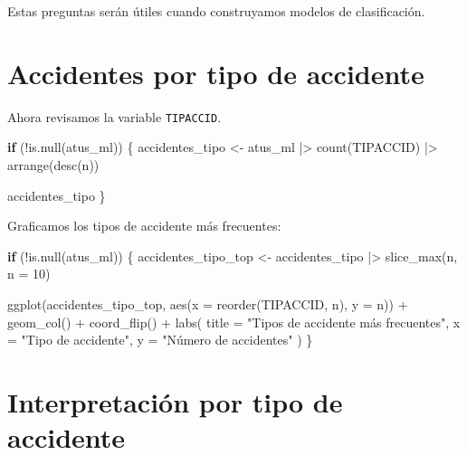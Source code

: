 \documentclass[
  11pt,
  letterpaper,
]{book}
\newenvironment{Shaded}{\begin{snugshade}}{\end{snugshade}}
\newcommand{\AttributeTok}[1]{\textcolor[rgb]{0.40,0.45,0.13}{#1}}
\newcommand{\ControlFlowTok}[1]{\textcolor[rgb]{0.00,0.23,0.31}{\textbf{#1}}}
\newcommand{\DecValTok}[1]{\textcolor[rgb]{0.68,0.00,0.00}{#1}}
\newcommand{\FunctionTok}[1]{\textcolor[rgb]{0.28,0.35,0.67}{#1}}
\newcommand{\NormalTok}[1]{\textcolor[rgb]{0.00,0.23,0.31}{#1}}
\newcommand{\OtherTok}[1]{\textcolor[rgb]{0.00,0.23,0.31}{#1}}
\newcommand{\SpecialCharTok}[1]{\textcolor[rgb]{0.37,0.37,0.37}{#1}}
\newcommand{\StringTok}[1]{\textcolor[rgb]{0.13,0.47,0.30}{#1}}
\begin{document}
Estas preguntas serán útiles cuando construyamos modelos de
clasificación.

\section{Accidentes por tipo de
accidente}\label{accidentes-por-tipo-de-accidente}

Ahora revisamos la variable \texttt{TIPACCID}.

\begin{Shaded}
\begin{Highlighting}[]
\ControlFlowTok{if}\NormalTok{ (}\SpecialCharTok{!}\FunctionTok{is.null}\NormalTok{(atus\_ml)) \{}
\NormalTok{  accidentes\_tipo }\OtherTok{\textless{}{-}}\NormalTok{ atus\_ml }\SpecialCharTok{|\textgreater{}}
    \FunctionTok{count}\NormalTok{(TIPACCID) }\SpecialCharTok{|\textgreater{}}
    \FunctionTok{arrange}\NormalTok{(}\FunctionTok{desc}\NormalTok{(n))}

\NormalTok{  accidentes\_tipo}
\NormalTok{\}}
\end{Highlighting}
\end{Shaded}

Graficamos los tipos de accidente más frecuentes:

\begin{Shaded}
\begin{Highlighting}[]
\ControlFlowTok{if}\NormalTok{ (}\SpecialCharTok{!}\FunctionTok{is.null}\NormalTok{(atus\_ml)) \{}
\NormalTok{  accidentes\_tipo\_top }\OtherTok{\textless{}{-}}\NormalTok{ accidentes\_tipo }\SpecialCharTok{|\textgreater{}}
    \FunctionTok{slice\_max}\NormalTok{(n, }\AttributeTok{n =} \DecValTok{10}\NormalTok{)}

  \FunctionTok{ggplot}\NormalTok{(accidentes\_tipo\_top, }\FunctionTok{aes}\NormalTok{(}\AttributeTok{x =} \FunctionTok{reorder}\NormalTok{(TIPACCID, n), }\AttributeTok{y =}\NormalTok{ n)) }\SpecialCharTok{+}
    \FunctionTok{geom\_col}\NormalTok{() }\SpecialCharTok{+}
    \FunctionTok{coord\_flip}\NormalTok{() }\SpecialCharTok{+}
    \FunctionTok{labs}\NormalTok{(}
      \AttributeTok{title =} \StringTok{"Tipos de accidente más frecuentes"}\NormalTok{,}
      \AttributeTok{x =} \StringTok{"Tipo de accidente"}\NormalTok{,}
      \AttributeTok{y =} \StringTok{"Número de accidentes"}
\NormalTok{    )}
\NormalTok{\}}
\end{Highlighting}
\end{Shaded}

\section{Interpretación por tipo de
accidente}\label{interpretaciuxf3n-por-tipo-de-accidente}
\end{document}
